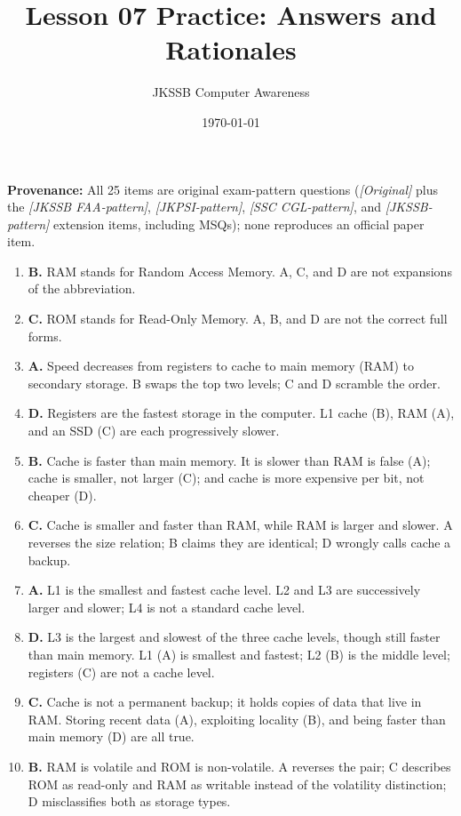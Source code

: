 \documentclass[11pt]{article}
\title{Lesson 07 Practice: Answers and Rationales}
\author{JKSSB Computer Awareness}
\date{\today}
\begin{document}
\maketitle
\noindent\textbf{Provenance:} All 25 items are original exam-pattern questions (\textit{[Original]} plus the \textit{[JKSSB FAA-pattern]}, \textit{[JKPSI-pattern]}, \textit{[SSC CGL-pattern]}, and \textit{[JKSSB-pattern]} extension items, including MSQs); none reproduces an official paper item.
\begin{enumerate}[label=\textbf{Q\arabic*.}, leftmargin=*]
\item \textbf{B.} RAM stands for Random Access Memory. A, C, and D are not
  expansions of the abbreviation.
\item \textbf{C.} ROM stands for Read-Only Memory. A, B, and D are not the
  correct full forms.
\item \textbf{A.} Speed decreases from registers to cache to main memory
  (RAM) to secondary storage. B swaps the top two levels; C and D scramble
  the order.
\item \textbf{D.} Registers are the fastest storage in the computer. L1
  cache (B), RAM (A), and an SSD (C) are each progressively slower.
\item \textbf{B.} Cache is faster than main memory. It is slower than RAM is
  false (A); cache is smaller, not larger (C); and cache is more expensive
  per bit, not cheaper (D).
\item \textbf{C.} Cache is smaller and faster than RAM, while RAM is larger
  and slower. A reverses the size relation; B claims they are identical; D
  wrongly calls cache a backup.
\item \textbf{A.} L1 is the smallest and fastest cache level. L2 and L3 are
  successively larger and slower; L4 is not a standard cache level.
\item \textbf{D.} L3 is the largest and slowest of the three cache levels,
  though still faster than main memory. L1 (A) is smallest and fastest; L2
  (B) is the middle level; registers (C) are not a cache level.
\item \textbf{C.} Cache is not a permanent backup; it holds copies of data
  that live in RAM. Storing recent data (A), exploiting locality (B), and
  being faster than main memory (D) are all true.
\item \textbf{B.} RAM is volatile and ROM is non-volatile. A reverses the
  pair; C describes ROM as read-only and RAM as writable instead of the
  volatility distinction; D misclassifies both as storage types.

\end{enumerate}
\end{document}
